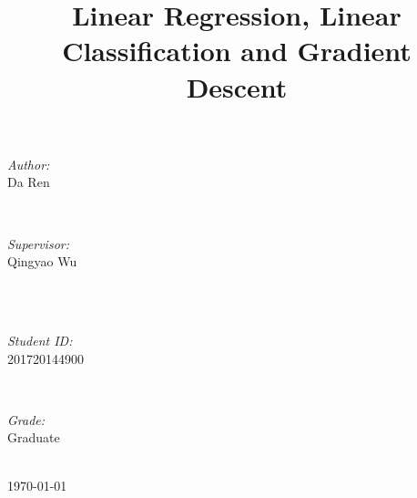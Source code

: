 \documentclass[journal, a4paper]{IEEEtran}
\begin{document}
\begin{titlepage}
\begin{minipage}{0.4\textwidth}
\begin{flushleft} \large
\emph{Author:}\\
Da Ren %
\end{flushleft}
\end{minipage}
~
\begin{minipage}{0.4\textwidth}
\begin{flushright} \large
\emph{Supervisor:} \\
Qingyao Wu %
\end{flushright}
\end{minipage}\\[2cm]
~
\begin{minipage}{0.4\textwidth}
\begin{flushleft} \large
\emph{Student ID:}\\
201720144900
\end{flushleft}
\end{minipage}
~
\begin{minipage}{0.4\textwidth}
\begin{flushright} \large
\emph{Grade:} \\
Graduate
\end{flushright}
\end{minipage}\\[2cm]



{\large \today}\\[2cm] %



\vfill %

\end{titlepage}

	\title{Linear Regression, Linear Classification and Gradient Descent}
	\maketitle
\end{document}
